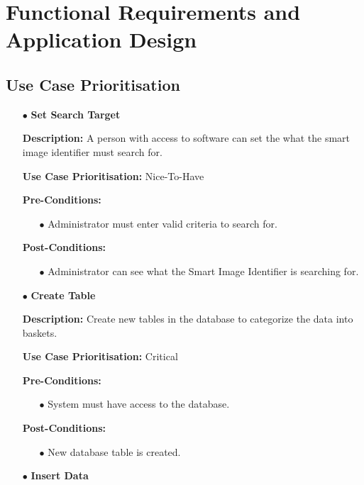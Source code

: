 \documentclass[a4paper,12pt]{report}
\begin{document}
\section{Functional Requirements and Application Design}
\subsection{Use Case Prioritisation}
	\begin{itemize}
		\item[$\bullet$]\textbf{Set Search Target}\newline

		\textbf{Description:} A person with access to software can set the what the smart image identifier must search for.\newline
		
		\textbf{Use Case Prioritisation:} Nice-To-Have\newline

		\textbf{Pre-Conditions:}
		\begin{itemize}
			\item[$\bullet$]Administrator must enter valid criteria to search for.
			\\
		\end{itemize}
		\textbf{Post-Conditions: }
		\begin{itemize}
			\item[$\bullet$]Administrator can see what the Smart Image Identifier is searching for.
			\\
		\end{itemize}
		\item[$\bullet$]\textbf{Create Table}\newline

		\textbf{Description:} Create new tables in the database to categorize the data into baskets.\newline
		
		\textbf{Use Case Prioritisation:} Critical\newline
		
		\textbf{Pre-Conditions:}
		\begin{itemize}
			\item[$\bullet$]System must have access to the database.
			\\
		\end{itemize}
		\textbf{Post-Conditions: }
		\begin{itemize}
			\item[$\bullet$]New database table is created.
			\\
		\end{itemize}
		\newpage
		\item[$\bullet$]\textbf{Insert Data}\newline


\end{itemize}
\end{document}
